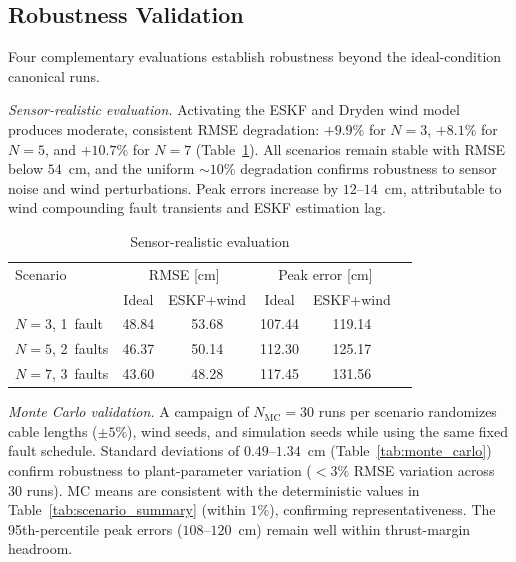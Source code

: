 \subsection{Robustness Validation}
\label{sec:sensor_realistic}

Four complementary evaluations establish robustness beyond the ideal-condition canonical runs.

\emph{Sensor-realistic evaluation.}
Activating the ESKF and Dryden wind model produces moderate, consistent RMSE degradation: $+9.9\%$ for $N{=}3$, $+8.1\%$ for $N{=}5$, and $+10.7\%$ for $N{=}7$ (Table~\ref{tab:sensor_realistic}). All scenarios remain stable with RMSE below $54$~cm, and the uniform ${\sim}10\%$ degradation confirms robustness to sensor noise and wind perturbations. Peak errors increase by $12$--$14$~cm, attributable to wind compounding fault transients and ESKF estimation lag.

\begin{table}[h]
\centering
\caption{Sensor-realistic evaluation}
\label{tab:sensor_realistic}
\begin{tabular}{lccccc}
\toprule
Scenario & \multicolumn{2}{c}{RMSE [cm]} & \multicolumn{2}{c}{Peak error [cm]} \\
         & Ideal & ESKF+wind & Ideal & ESKF+wind \\
\midrule
$N{=}3$, 1~fault   & 48.84 & 53.68 & 107.44 & 119.14 \\
$N{=}5$, 2~faults  & 46.37 & 50.14 & 112.30 & 125.17 \\
$N{=}7$, 3~faults  & 43.60 & 48.28 & 117.45 & 131.56 \\
\bottomrule
\end{tabular}
\end{table}

\emph{Monte Carlo validation.}\label{sec:monte_carlo}
A campaign of $N_{\mathrm{MC}} = 30$ runs per scenario randomizes cable lengths (${\pm}5\%$), wind seeds, and simulation seeds while using the same fixed fault schedule. Standard deviations of $0.49$--$1.34$~cm (Table~\ref{tab:monte_carlo}) confirm robustness to plant-parameter variation ($<3\%$ RMSE variation across $30$ runs). MC means are consistent with the deterministic values in Table~\ref{tab:scenario_summary} (within $1\%$), confirming representativeness. The 95th-percentile peak errors ($108$--$120$~cm) remain well within thrust-margin headroom.

